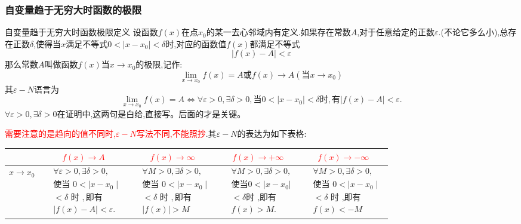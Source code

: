 \documentclass[9pt a4paper, oneside, UTF8]{ctexbook}
\begin{document}
\begin{sloppypar}
    \subsubsection{自变量趋于无穷大时函数的极限}
    \begin{defn}{自变量趋于无穷大时函数极限定义}{}
        设函数$f(x)$在点$x_0$的某一去心邻域内有定义.如果存在常数$A$,对于任意给定的正数$\varepsilon$.(不论它多么小),总存在正数$\delta$,使得当$x$满足不等式$0<|x-x_0|<\delta$时,对应的函数值$f(x)$都满足不等式
        $$
            |f(x)-A|<\varepsilon
        $$
        那么常数$A$叫做函数$f(x)$当$x \to x_0$的极限,记作:
        $$
            \lim_{x\to x_0}f(x)=A\text{或}f(x)\to A(\text{当}x\to x_0)
        $$
        其$\varepsilon-N$语言为
        $$
            \lim\limits_{x\to x_0}f(x)=A\Leftrightarrow\forall\varepsilon>0,\exists\delta>0,\text{当}0<|x-x_0|<\delta\text{时},\text{有}|f(x)-A|<\varepsilon.
        $$
        $\forall\varepsilon>0,\exists\delta>0$在证明中,这两句是白给,直接写。后面的才是关键。
    \end{defn}
    \textcolor{red}{需要注意的是趋向的值不同时,$\varepsilon -N$写法不同,不能照抄}.其$\varepsilon -N$的表达为如下表格:
    \begin{center}
        \begin{tabular}{|c|c|c|c|c|}
            \hline
            & \textcolor{red}{$f(x)\to A$} & \textcolor{red}{$f(x)\to \infty$} & \textcolor{red}{$f(x)\to +\infty$} & \textcolor{red}{$f(x)\to -\infty$}\\
            \hline
            $x \to x_0$       & $\begin{aligned}&\forall\varepsilon>0,\exists\delta>0, \\&\text{使当 }0<\mid x-x_0\mid  \\&<\delta\text{ 时 },\text{即有} \\&|f(x)-A|<\varepsilon.\end{aligned}$ & $\begin{aligned}&\forall M>0,\exists\delta>0, \\&\text{使当 }0<\mid x-x_{0}\mid  \\&<\delta\text{ 时 },\text{即有}\\& |f(x)|>M\end{aligned}$ & $\begin{aligned}&\forall M>0,\exists\delta>0, \\&\text{使当} 0<|x-x_0| \\ &<\delta \text{时 ,即有} \\ &f(x)>M.\end{aligned}$      & $\begin{aligned}&\forall M>0,\exists\delta>0, \\&\text{使当 }0<\mid x-x_{0}\mid  \\&<\delta\text{ 时 ,即有}\\& f(x) <-M\end{aligned}$ \\ \hline

\end{tabular}
\end{center}
\end{sloppypar}
\end{document}
